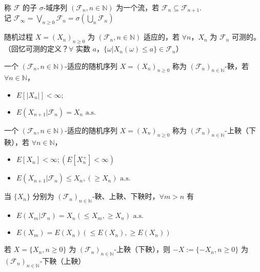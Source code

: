 \documentclass[lang=cn,10pt,thmcnt=section]{elegantbook}
\begin{document}
\begin{definition}
	称 $\mathcal{F}$ 的子 $\sigma$-域序列 $(\mathcal{F}_n, n \in \mathbb{N})$ 为一个流，若 $\mathcal{F}_n \subseteq \mathcal{F}_{n+1}$. \\
记 $\mathcal{F}_\infty = \bigvee_{n \geq 0} \mathcal{F}_n = \sigma(\bigcup_n \mathcal{F}_n)$
\end{definition}
\begin{definition}
	随机过程 $X = (X_n)_{n \geq 0}$ 为 $(\mathcal{F}_n, n \in \mathbb{N})$ 适应的，若 $\forall n$，$X_n$ 为 $\mathcal{F}_n$ 可测的。（回忆可测的定义？$\forall$ 实数 $a$，$\{\omega | X_n(\omega) \leq a\} \in \mathcal{F}_n$）
\end{definition}
\begin{definition}
	一个 $(\mathcal{F}_n, n \in \mathbb{N})$-适应的随机序列 $X = (X_n)_{n \geq 0}$ 称为 $(\mathcal{F}_n)_{n \in \mathbb{N}}$-鞅，若 $\forall n \in \mathbb{N}$，
\begin{itemize}
    \item $E[|X_n|] < \infty;$
    \item $E(X_{n+1}|\mathcal{F}_n) = X_n \text{ a.s.}$
\end{itemize}
\end{definition}
\begin{definition}
	一个 $(\mathcal{F}_n, n \in \mathbb{N})$-适应的随机序列 $X = (X_n)_{n \geq 0}$ 称为 $(\mathcal{F}_n)_{n \in \mathbb{N}}$-上鞅（下鞅），若 $\forall n \in \mathbb{N}$，
\begin{itemize}
    \item $E[X_n] < \infty; (E[X_n^+] < \infty)$
    \item $E(X_{n+1}|\mathcal{F}_n) \leq X_n, (\geq X_n) \text{ a.s.}$
\end{itemize}

\end{definition}
\begin{remark}
	当 $\{X_n\}$ 分别为 $(\mathcal{F}_n)_{n \in \mathbb{N}}$-鞅、上鞅、下鞅时，$\forall m > n$ 有
\begin{itemize}
    \item $E(X_m|\mathcal{F}_n) = X_n (\leq X_m, \geq X_n) \text{ a.s.}$
    \item $E(X_m) = E(X_n) (\leq E(X_n), \geq E(X_n))$
\end{itemize}
\end{remark}
\begin{remark}
	若 $X = \{X_n, n \geq 0\}$ 为 $(\mathcal{F}_n)_{n \in \mathbb{N}}$-上鞅（下鞅），则 $-X := \{-X_n, n \geq 0\}$ 为 $(\mathcal{F}_n)_{n \in \mathbb{N}}$-下鞅（上鞅）
\end{remark}
\end{document}
